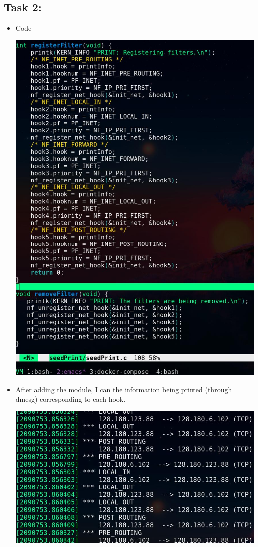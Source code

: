 \documentclass[11pt]{article}
\begin{document}
\subsection*{Task 2:}
\label{sec:org1e7d050}
\begin{itemize}
\item Code
\begin{center}
\includegraphics[width=.9\linewidth]{./images/03.jpg}
\end{center}
\item After adding the module, I can the information being printed (through dmesg) corresponding to each hook.
\begin{center}
\includegraphics[width=.9\linewidth]{./images/04.jpg}
\end{center}
\end{itemize}
\end{document}
